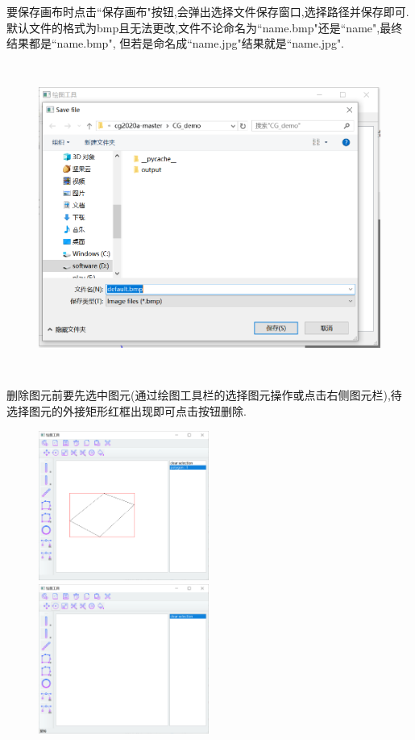 \documentclass[a4paper,UTF8]{article}
\theoremstyle{definition}
\begin{document}
要保存画布时点击``保存画布"按钮,会弹出选择文件保存窗口,选择路径并保存即可.默认文件的格式为bmp且无法更改,文件不论命名为``name.bmp"还是``name",最终结果都是``name.bmp", 但若是命名成``name.jpg"结果就是``name.jpg".
\begin{figure}[H]
	\includegraphics[width=5in,height=4in]{save.png}
\end{figure}
删除图元前要先选中图元(通过绘图工具栏的选择图元操作或点击右侧图元栏),待选择图元的外接矩形红框出现即可点击按钮删除.\\
\begin{figure}[H]
	\centering
	\begin{minipage}[t]{0.5\linewidth}
		\includegraphics[width=2.2in]{delete1.png}
	\end{minipage}%
	\begin{minipage}[t]{0.5\linewidth}
		\includegraphics[width=2.2in]{delete2.png}
	\end{minipage}
\end{figure}
\end{document}
